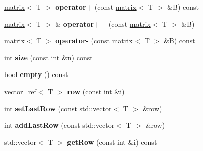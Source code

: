\begin{DoxyCompactItemize}
\item 
\hypertarget{classkeycpp_1_1matrix_a8c0520cf5064379afa5128cf7f660832}{\hyperlink{classkeycpp_1_1matrix}{matrix}$<$ T $>$ {\bfseries operator+} (const \hyperlink{classkeycpp_1_1matrix}{matrix}$<$ T $>$ \&B) const }\label{classkeycpp_1_1matrix_a8c0520cf5064379afa5128cf7f660832}

\item 
\hypertarget{classkeycpp_1_1matrix_a78655e73267b48e16909a68291f4c074}{\hyperlink{classkeycpp_1_1matrix}{matrix}$<$ T $>$ \& {\bfseries operator+=} (const \hyperlink{classkeycpp_1_1matrix}{matrix}$<$ T $>$ \&B)}\label{classkeycpp_1_1matrix_a78655e73267b48e16909a68291f4c074}

\item 
\hypertarget{classkeycpp_1_1matrix_a1c6cb00f8859e6486a7054f11b1c7e6a}{\hyperlink{classkeycpp_1_1matrix}{matrix}$<$ T $>$ {\bfseries operator-\/} (const \hyperlink{classkeycpp_1_1matrix}{matrix}$<$ T $>$ \&B) const }\label{classkeycpp_1_1matrix_a1c6cb00f8859e6486a7054f11b1c7e6a}

\item 
\hypertarget{classkeycpp_1_1matrix_a32a13ebb69fb5f06dd8923d942d865b4}{int {\bfseries size} (const int \&n) const }\label{classkeycpp_1_1matrix_a32a13ebb69fb5f06dd8923d942d865b4}

\item 
\hypertarget{classkeycpp_1_1matrix_ad522f701e86eafc344d8904d4f0a8f19}{bool {\bfseries empty} () const }\label{classkeycpp_1_1matrix_ad522f701e86eafc344d8904d4f0a8f19}

\item 
\hypertarget{classkeycpp_1_1matrix_ab4711ffa4b634c69215f857561f1ed98}{\hyperlink{classkeycpp_1_1vector__ref}{vector\-\_\-ref}$<$ T $>$ {\bfseries row} (const int \&i)}\label{classkeycpp_1_1matrix_ab4711ffa4b634c69215f857561f1ed98}

\item 
\hypertarget{classkeycpp_1_1matrix_ac7675f496771e688a1c059b58ac975cb}{int {\bfseries set\-Last\-Row} (const std\-::vector$<$ T $>$ \&row)}\label{classkeycpp_1_1matrix_ac7675f496771e688a1c059b58ac975cb}

\item 
\hypertarget{classkeycpp_1_1matrix_aa6903fc828a5b42f7c1d9485832601aa}{int {\bfseries add\-Last\-Row} (const std\-::vector$<$ T $>$ \&row)}\label{classkeycpp_1_1matrix_aa6903fc828a5b42f7c1d9485832601aa}

\item 
\hypertarget{classkeycpp_1_1matrix_a14cad5ff7a9b3079754fc83b677208ed}{std\-::vector$<$ T $>$ {\bfseries get\-Row} (const int \&i) const }\label{classkeycpp_1_1matrix_a14cad5ff7a9b3079754fc83b677208ed}


\end{DoxyCompactItemize}
